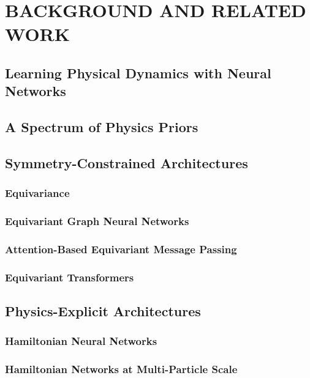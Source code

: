 \chapter{BACKGROUND AND RELATED WORK}
\label{ch:background}


\section{Learning Physical Dynamics with Neural Networks}
\section{A Spectrum of Physics Priors}
\section{Symmetry-Constrained Architectures}
\subsection{Equivariance}
\subsection{Equivariant Graph Neural Networks}
\subsection{Attention-Based Equivariant Message Passing}
\subsection{Equivariant Transformers}
\section{Physics-Explicit Architectures}
\subsection{Hamiltonian Neural Networks}
\subsection{Hamiltonian Networks at Multi-Particle Scale}
